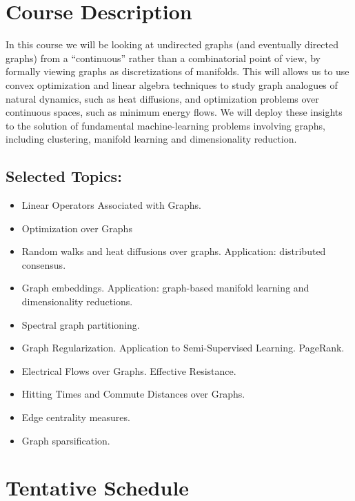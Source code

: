 \documentclass{article}
\begin{document}
\section{Course Description}

In this course we will be looking at undirected graphs (and eventually directed graphs) from a ``continuous'' rather than a combinatorial point of view, by formally viewing graphs as discretizations of manifolds. This will allows us to use convex optimization and linear algebra techniques to study graph analogues of natural dynamics, such as heat diffusions, and optimization problems over continuous spaces, such as minimum energy flows. We will deploy these insights to the solution of fundamental machine-learning problems involving graphs, 
including clustering, manifold learning and 
dimensionality reduction. 



\subsection{Selected Topics:}
\begin{itemize}
    \item Linear Operators Associated with Graphs.
    \item Optimization over Graphs
    \item Random walks and heat diffusions over graphs. Application: distributed consensus. 
    \item Graph embeddings. Application: graph-based manifold learning and dimensionality reductions.
    \item Spectral graph partitioning. 
    \item Graph Regularization. Application to Semi-Supervised Learning. PageRank.
    \item Electrical Flows over Graphs. Effective Resistance.
    \item Hitting Times and Commute Distances over Graphs.
    \item Edge centrality measures.
    \item Graph sparsification.
\end{itemize}

\section{Tentative Schedule}


\end{document}
